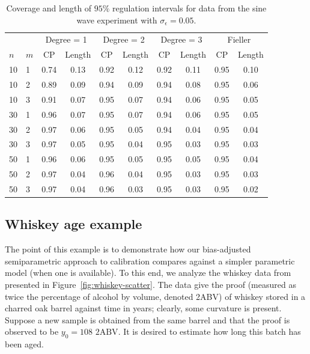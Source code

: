 \documentclass[cmfont,usenames,dvipsnames,leqno]{afit-etd}\usepackage[]{graphicx}\usepackage[]{color}
\begin{document}
\begin{table}[H]%
\centering
  \begin{tabular}{llcccccccc}
  \toprule
  \phantom{abc} & \phantom{abc} & \multicolumn{2}{c}{Degree = 1} & \multicolumn{2}{c}{Degree = 2} & \multicolumn{2}{c}{Degree = 3} & \multicolumn{2}{c}{Fieller} \\
  \cline{3-10}
  $n$ & $m$ & CP & Length & CP & Length & CP & Length & CP & Length \\
  \hline
  10  &  1  & 0.74 & 0.13 & 0.92 & 0.12 & 0.92 & 0.11 & 0.95 & 0.10 \\
  10  &  2  & 0.89 & 0.09 & 0.94 & 0.09 & 0.94 & 0.08 & 0.95 & 0.06 \\
  10  &  3  & 0.91 & 0.07 & 0.95 & 0.07 & 0.94 & 0.06 & 0.95 & 0.05 \\
  \hline
  30  &  1  & 0.96 & 0.07 & 0.95 & 0.07 & 0.94 & 0.06 & 0.95 & 0.05 \\
  30  &  2  & 0.97 & 0.06 & 0.95 & 0.05 & 0.94 & 0.04 & 0.95 & 0.04 \\
  30  &  3  & 0.97 & 0.05 & 0.95 & 0.04 & 0.95 & 0.03 & 0.95 & 0.03 \\
  \hline
  50  &  1  & 0.96 & 0.06 & 0.95 & 0.05 & 0.95 & 0.05 & 0.95 & 0.04 \\
  50  &  2  & 0.97 & 0.04 & 0.96 & 0.04 & 0.95 & 0.03 & 0.95 & 0.03 \\
  50  &  3  & 0.97 & 0.04 & 0.96 & 0.03 & 0.95 & 0.03 & 0.95 & 0.02 \\
  \bottomrule
  \end{tabular}
\caption[Semiparametric regulation Monte Carlo simulation]{Coverage and length of $95\%$ regulation intervals for data from the sine wave experiment with $\sigma_\epsilon = 0.05$. \label{tab:pspline-monte-carlo-2}}
\end{table}

\subsection{Whiskey age example}
\label{sec:whiskey}
The point of this example is to demonstrate how our bias-adjusted semiparametric approach to calibration compares against a simpler parametric model (when one is available). To this end, we analyze the whiskey data from \citet{schoeneman_analytical_1971} presented in Figure~\ref{fig:whiskey-scatter}. The data give the proof (measured as twice the percentage of alcohol by volume, denoted 2ABV) of whiskey stored in a charred oak barrel against time in years; clearly, some curvature is present. Suppose a new sample is obtained from the same barrel and that the proof is observed to be $y_0 = 108 \text{ 2ABV}$. It is desired to estimate how long this batch has been aged.
\end{document}
